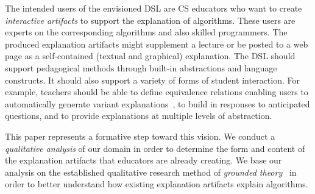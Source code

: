 \documentclass[sigconf]{acmart}
\begin{document}
The intended users of the envisioned DSL are CS educators who want to create
\emph{interactive artifacts} to support the explanation of algorithms. These
users are experts on the corresponding algorithms and also skilled
programmers. The produced explanation artifacts might supplement a lecture or
be posted to a web page as a self-contained (textual and graphical)
explanation.
%
The DSL should support pedagogical methods through built-in
abstractions and language constructs. It should also support a variety of forms
of student interaction. For example, teachers should be able to define
equivalence relations enabling users to automatically generate variant
explanations~\cite{EW13jvlc}, to build in responses to anticipated
questions, and to provide explanations at multiple levels of abstraction.


This paper represents a formative step toward this vision. We conduct a
\emph{qualitative analysis} of our domain in order to determine the form and
content of the explanation artifacts that educators are already creating.
%
We base our analysis on the established qualitative research method of
\emph{grounded theory}~\cite{Strauss67discoveryof} in order to better understand
how existing explanation artifacts explain algorithms.
\end{document}
